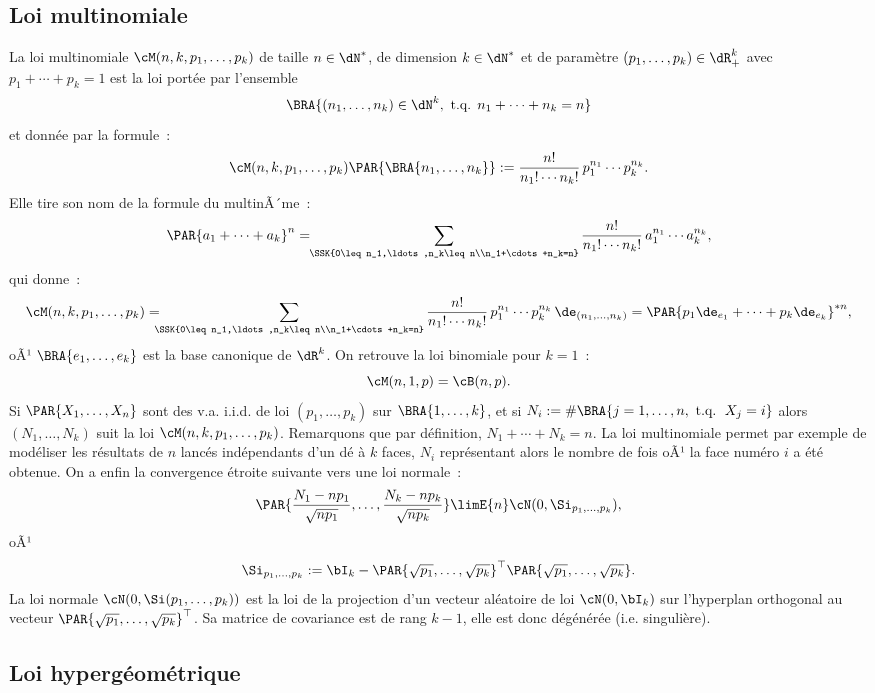 {{%
\subsection{Loi multinomiale}\label{ss:loi:multinomiale}
%

La loi multinomiale $\cM(n,k,p_1,\ldots,p_k)$ de taille $n\in\dN^*$, de dimension
$k\in\dN^*$ et de paramètre $(p_1,\ldots,p_k)\in\dR_+^k$ 
avec $p_1+\cdots+p_k=1$ est la loi portée par l'ensemble
$$
\BRA{(n_1,\ldots,n_k) \in \dN^k, \text{ t.q. } n_1+\cdots+n_k=n}
$$
et donnée par la formule~:
$$
\cM(n,k,p_1,\ldots,p_k)\PAR{\BRA{n_1,\ldots,n_k}}
:=\frac{n!}{n_1!\cdots n_k!}\,p_1^{n_1}\cdots p_k^{n_k}.
$$
Elle tire son nom de la formule du multinÃ´me~: 
$$
\PAR{a_1+\cdots+a_k}^n=
\!\!\sum_{\SSK{0\leq n_1,\ldots,n_k\leq n\\n_1+\cdots+n_k=n}} 
\frac{n!}{n_1!\cdots n_k!}\,a_1^{n_1}\cdots a_k^{n_k}, 
$$
qui donne~:
$$
\cM(n,k,p_1,\ldots,p_k) = 
\!\!\!\!\sum_{\SSK{0\leq n_1,\ldots,n_k\leq n\\n_1+\cdots+n_k=n}} 
\frac{n!}{n_1!\cdots n_k!}\,p_1^{n_1}\cdots p_k^{n_k} 
\,\de_{(n_1,\ldots,n_k)} = \PAR{p_1\de_{e_1}+\cdots+p_k\de_{e_k}}^{*n},
$$
oÃ¹ $\BRA{e_1,\ldots,e_k}$ est la base canonique de $\dR^k$.
On retrouve la loi binomiale pour $k=1$~: 
$$
\cM(n,1,p)=\cB(n,p).
$$
Si $\PAR{X_1,\ldots,X_n}$ sont des v.a. i.i.d. de loi $(p_1,\ldots,p_k)$ sur 
$\BRA{1,\ldots,k}$, et si 
$N_i:=\#\BRA{j=1,\ldots,n,\text{ t.q. }\, X_j=i}$ 
alors $(N_1,\ldots,N_k)$ suit la loi $\cM(n,k,p_1,\ldots,p_k)$. 
Remarquons que par définition, $N_1+\cdots+N_k=n$. La loi
multinomiale permet par exemple de modéliser les résultats de $n$ lancés
indépendants d'un dé à $k$ faces, $N_i$ représentant alors le nombre de fois
oÃ¹ la face numéro $i$ a été obtenue. On a enfin la convergence étroite
suivante vers une loi normale~:
$$
\PAR{\frac{N_1-np_1}{\sqrt{np_1}},\ldots,\frac{N_k-np_k}{\sqrt{np_k}}}
\limE{n} \cN(0,\Si_{p_1,\ldots,p_k}),
$$
oÃ¹ 
$$
\Si_{p_1,\ldots,p_k}:=\bI_k-\PAR{\sqrt{p_1},\ldots,\sqrt{p_k}}^\top\PAR{\sqrt{p_1},\ldots,\sqrt{p_k}}.
$$
La loi normale $\cN(0,\Si(p_1,\ldots,p_k))$ est la loi de la projection d'un
vecteur aléatoire de loi $\cN(0,\bI_k)$ sur l'hyperplan orthogonal au vecteur
$\PAR{\sqrt{p_1},\ldots,\sqrt{p_k}}^\top$. Sa matrice de covariance est de rang $k-1$,
elle est donc dégénérée (i.e. singulière).

%
\subsection{Loi hypergéométrique}\label{loi:hypergeom}
%

}}

